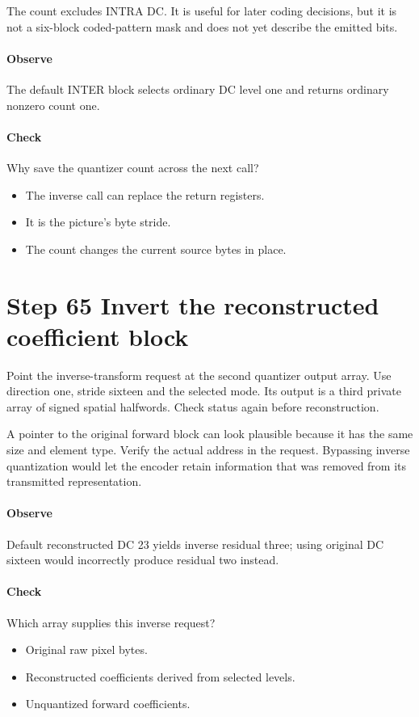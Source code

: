 The count excludes INTRA DC. It is useful for later coding decisions, but it
is not a six-block coded-pattern mask and does not yet describe the emitted bits.

\paragraph{Observe} The default INTER block selects ordinary DC level one and
returns ordinary nonzero count one.
\paragraph{Check} Why save the quantizer count across the next call?
\begin{itemize}
  \item[A.] The inverse call can replace the return registers.
  \item[B.] It is the picture's byte stride.
  \item[C.] The count changes the current source bytes in place.
\end{itemize}

\section{Step 65 Invert the reconstructed coefficient block}\label{h263-block-s05}
Point the inverse-transform request at the second quantizer output array.
Use direction one, stride sixteen and the selected mode. Its output is a third
private array of signed spatial halfwords. Check status again before reconstruction.

A pointer to the original forward block can look plausible because it has the
same size and element type. Verify the actual address in the request. Bypassing
inverse quantization would let the encoder retain information that was removed
from its transmitted representation.

\paragraph{Observe} Default reconstructed DC 23 yields inverse residual three;
using original DC sixteen would incorrectly produce residual two instead.
\paragraph{Check} Which array supplies this inverse request?
\begin{itemize}
  \item[A.] Original raw pixel bytes.
  \item[B.] Reconstructed coefficients derived from selected levels.
  \item[C.] Unquantized forward coefficients.
\end{itemize}

